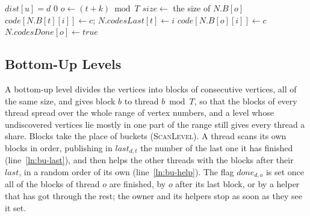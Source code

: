 \begin{algorithm}
\caption{Frontier codes: the test of a bottom-up level whose frontier has the code $c$, the code that its discoveries write, and the pass that writes the codes of a frontier that a top-down level discovered, as thread $t$ runs it.}
\label{alg:codes}
\begin{algorithmic}[1]
    \State \Return $\mathit{dist}[u] = d$
\EndProcedure
\Statex
{}
    \State \Return $0$
\EndProcedure
\Statex
{}
        \State $o \gets (t + k) \bmod T$
        \State $\mathit{size} \gets$ the size of $N.B[o]$
                \State $\mathit{code}[N.B[t][i]] \gets c$; $N.\mathit{codesLast}[t] \gets i$
            \EndFor
        \Else
                \State $\mathit{code}[N.B[o][i]] \gets c$
            \EndFor
        \EndIf
        \State $N.\mathit{codesDone}[o] \gets \mathit{true}$
    \EndFor
\EndProcedure
\end{algorithmic}
\end{algorithm}

\subsection{Bottom-Up Levels}
\label{sec:do-bu}

A bottom-up level divides the vertices into blocks of consecutive vertices, all of the same size, and gives block $b$ to thread $b \bmod T$, so that the blocks of every thread spread over the whole range of vertex numbers, and a level whose undiscovered vertices lie mostly in one part of the range still gives every thread a share. Blocks take the place of buckets (\textsc{ScanLevel}). A thread scans its own blocks in order, publishing in $\mathit{last}_{d,t}$ the number of the last one it has finished (line~\ref{ln:bu-last}), and then helps the other threads with the blocks after their $\mathit{last}$, in a random order of its own (line~\ref{ln:bu-help}). The flag $\mathit{done}_{d,o}$ is set once all of the blocks of thread $o$ are finished, by $o$ after its last block, or by a helper that has got through the rest; the owner and its helpers stop as soon as they see it set.

